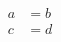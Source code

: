 \documentclass{article}
\begin{document}
\begin{align}
a &= b \tag{F1} \\
c &= d \tag{F2}
\end{align}
\end{document}
